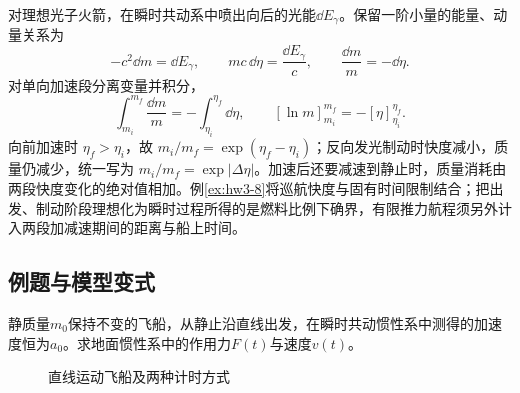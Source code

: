 对理想光子火箭，在瞬时共动系中喷出向后的光能$\dd E_\gamma$。保留一阶小量的能量、动量关系为
\[
 -c^2\dd m=\dd E_\gamma,\qquad
 mc\,\dd\eta=\frac{\dd E_\gamma}{c},
 \qquad\frac{\dd m}{m}=-\dd\eta.
\]
对单向加速段分离变量并积分，
\[
\int_{m_i}^{m_f}\frac{\dd m}m=-\int_{\eta_i}^{\eta_f}\dd\eta,
\qquad [\ln m]_{m_i}^{m_f}=-[\eta]_{\eta_i}^{\eta_f}.
\]
向前加速时 $\eta_f>\eta_i$，故 $m_i/m_f=\exp(\eta_f-\eta_i)$；反向发光制动时快度减小，质量仍减少，统一写为 $m_i/m_f=\exp|\Delta\eta|$。加速后还要减速到静止时，质量消耗由两段快度变化的绝对值相加。例\ref{ex:hw3-8}将巡航快度与固有时间限制结合；把出发、制动阶段理想化为瞬时过程所得的是燃料比例下确界，有限推力航程须另外计入两段加减速期间的距离与船上时间。





\subsection{例题与模型变式}

\begin{example}[恒定固有加速度]\label{ex:hw3-7}

静质量$m_0$保持不变的飞船，从静止沿直线出发，在瞬时共动惯性系中测得的加速度恒为$a_0$。求地面惯性系中的作用力$F(t)$与速度$v(t)$。

\end{example}


\begin{figure}[H]\centering
{}
\caption{直线运动飞船及两种计时方式}\label{fig:hw3-7-q}
\end{figure}


